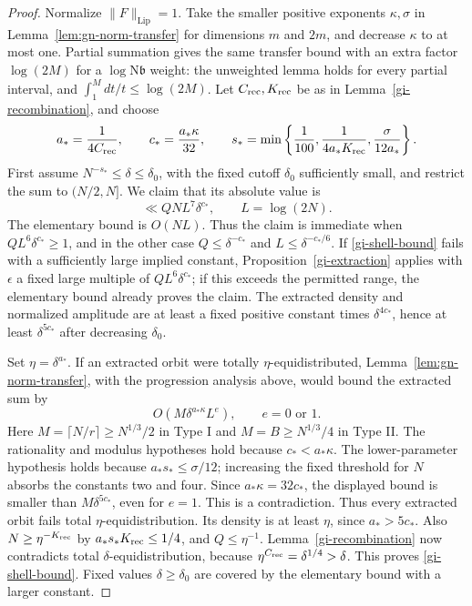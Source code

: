 \begin{proof}
Normalize $\|F\|_{\mathrm{Lip}}=1$.  Take the smaller positive exponents
$\kappa,\sigma$ in Lemma~\ref{lem:gn-norm-transfer} for dimensions $m$
and $2m$, and decrease $\kappa$ to at most one.  Partial summation gives
the same transfer bound with an extra factor $\log(2M)$ for a
$\log\mathrm N\mathfrak b$ weight: the unweighted lemma holds for
every partial interval, and $\int_1^Mdt/t\leq\log(2M)$.
Let $C_{\rm rec},K_{\rm rec}$ be as in Lemma~\ref{gi-recombination},
and choose
\begin{equation}\label{gi-exponent-choice}
 a_*=\frac1{4C_{\rm rec}},\qquad
 c_* =\frac{a_*\kappa}{32},\qquad
 s_* =\min\left\{\frac1{100},\frac1{4a_*K_{\rm rec}},
                             \frac{\sigma}{12a_*}\right\}.
\end{equation}
First assume $N^{-s_*}\leq\delta\leq\delta_0$, with the fixed cutoff
$\delta_0$ sufficiently small, and restrict the sum to $(N/2,N]$.
We claim that its absolute value is
\begin{equation}\label{gi-shell-bound}
                  \ll QNL^7\delta^{c_*},\qquad L=\log(2N).
\end{equation}
The elementary bound is $O(NL)$.  Thus the claim is immediate when
$QL^6\delta^{c_*}\geq1$, and in the other case
$Q\leq\delta^{-c_*}$ and $L\leq\delta^{-c_*/6}$.
If \eqref{gi-shell-bound} fails with a sufficiently large implied
constant, Proposition~\ref{gi-extraction} applies with
$\epsilon$ a fixed large multiple of $QL^6\delta^{c_*}$; if this
exceeds the permitted range, the elementary bound already proves the
claim.  The extracted density and normalized amplitude are at least
a fixed positive constant times $\delta^{4c_*}$, hence at least
$\delta^{5c_*}$ after decreasing $\delta_0$.

Set $\eta=\delta^{a_*}$.  If an extracted orbit were totally
$\eta$-equidistributed, Lemma~\ref{lem:gn-norm-transfer}, with the
progression analysis above, would bound the extracted sum by
\[
 O(M\delta^{a_*\kappa}L^e),\qquad e=0\text{ or }1.
\]
Here $M=\lceil N/r\rceil\geq N^{1/3}/2$ in Type I and
$M=B\geq N^{1/3}/4$ in Type II.  The rationality and modulus hypotheses
hold because $c_*<a_*\kappa$.  The lower-parameter hypothesis holds
because $a_*s_*\leq\sigma/12$; increasing the fixed threshold for $N$
absorbs the constants two and four.  Since $a_*\kappa=32c_*$, the
displayed bound is smaller than $M\delta^{5c_*}$, even for $e=1$.
This is a contradiction.  Thus every extracted orbit fails total
$\eta$-equidistribution.  Its density is at least $\eta$, since
$a_*>5c_*$.  Also $N\geq\eta^{-K_{\rm rec}}$ by
$a_*s_*K_{\rm rec}\leq1/4$, and $Q\leq\eta^{-1}$.
Lemma~\ref{gi-recombination} now contradicts total
$\delta$-equidistribution, because
$\eta^{C_{\rm rec}}=\delta^{1/4}>\delta$.  This proves
\eqref{gi-shell-bound}.  Fixed values $\delta\geq\delta_0$ are covered
by the elementary bound with a larger constant.


\end{proof}
